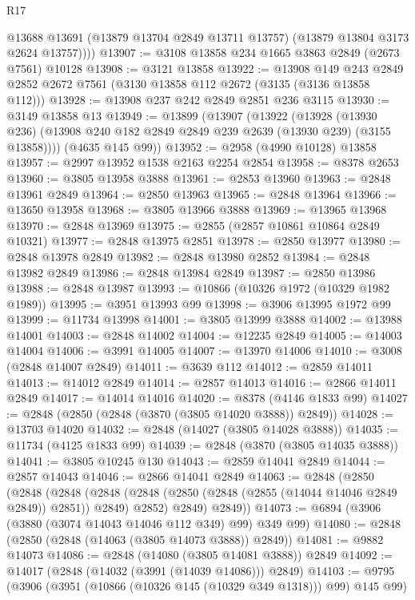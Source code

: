 \begin{lexlean}{R17}
\begin{coremodule}
          @13688
          @13691
          (@13879 @13704 @2849 @13711 @13757)
          (@13879 @13804 @3173 @2624 @13757))))
@13907 := @3108 @13858 @234 @1665 @3863 @2849 (@2673 @7561) @10128
@13908 := @3121 @13858
@13922 := @13908
    @149
    @243
    @2849
    @2852
    @2672
    @7561
    (@3130 @13858 @112 @2672 (@3135 (@3136 @13858 @112)))
@13928 := @13908 @237 @242 @2849 @2851 @236 @3115
@13930 := @3149 @13858 @13
@13949 := @13899
    (@13907
      (@13922
        (@13928
          (@13930 @236)
          (@13908 @240 @182 @2849 @2849 @239 @2639 (@13930 @239) (@3155 @13858))))
      (@4635 @145 @99))
@13952 := @2958 (@4990 @10128) @13858
@13957 := @2997 @13952 @1538 @2163 @2254 @2854
@13958 := @8378 @2653
@13960 := @3805 @13958 @3888
@13961 := @2853 @13960
@13963 := @2848 @13961 @2849
@13964 := @2850 @13963
@13965 := @2848 @13964
@13966 := @13650 @13958
@13968 := @3805 @13966 @3888
@13969 := @13965 @13968
@13970 := @2848 @13969
@13975 := @2855 (@2857 @10861 @10864 @2849 @10321)
@13977 := @2848 @13975 @2851
@13978 := @2850 @13977
@13980 := @2848 @13978 @2849
@13982 := @2848 @13980 @2852
@13984 := @2848 @13982 @2849
@13986 := @2848 @13984 @2849
@13987 := @2850 @13986
@13988 := @2848 @13987
@13993 := @10866 (@10326 @1972 (@10329 @1982 @1989))
@13995 := @3951 @13993 @99
@13998 := @3906 @13995 @1972 @99
@13999 := @11734 @13998
@14001 := @3805 @13999 @3888
@14002 := @13988 @14001
@14003 := @2848 @14002
@14004 := @12235 @2849
@14005 := @14003 @14004
@14006 := @3991 @14005
@14007 := @13970 @14006
@14010 := @3008 (@2848 @14007 @2849)
@14011 := @3639 @112
@14012 := @2859 @14011
@14013 := @14012 @2849
@14014 := @2857 @14013
@14016 := @2866 @14011 @2849
@14017 := @14014 @14016
@14020 := @8378 (@4146 @1833 @99)
@14027 := @2848 (@2850 (@2848 (@3870 (@3805 @14020 @3888)) @2849))
@14028 := @13703 @14020
@14032 := @2848 (@14027 (@3805 @14028 @3888))
@14035 := @11734 (@4125 @1833 @99)
@14039 := @2848 (@3870 (@3805 @14035 @3888))
@14041 := @3805 @10245 @130
@14043 := @2859 @14041 @2849
@14044 := @2857 @14043
@14046 := @2866 @14041 @2849
@14063 := @2848
    (@2850
      (@2848
        (@2848
          (@2848 (@2848 (@2850 (@2848 (@2855 (@14044 @14046 @2849 @2849)) @2851)) @2849) @2852)
          @2849)
        @2849))
@14073 := @6894 (@3906 (@3880 (@3074 @14043 @14046 @112 @349) @99) @349 @99)
@14080 := @2848 (@2850 (@2848 (@14063 (@3805 @14073 @3888)) @2849))
@14081 := @9882 @14073
@14086 := @2848 (@14080 (@3805 @14081 @3888)) @2849
@14092 := @14017 (@2848 (@14032 (@3991 (@14039 @14086))) @2849)
@14103 := @9795 (@3906 (@3951 (@10866 (@10326 @145 (@10329 @349 @1318))) @99) @145 @99)

\end{coremodule}
\end{lexlean}
